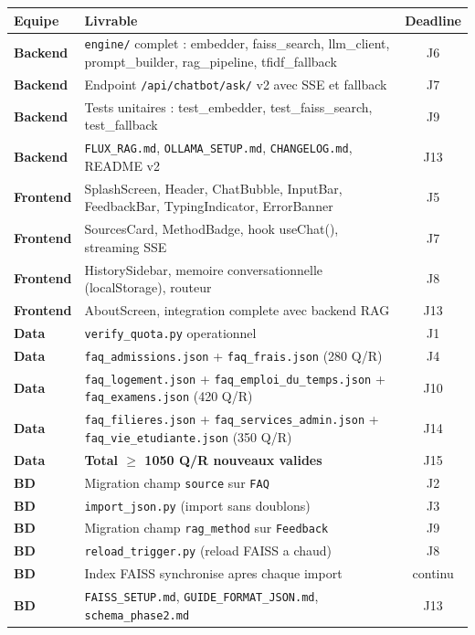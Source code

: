 \documentclass[11pt,a4paper]{article}
\begin{document}
\begin{center}
\begin{tabular}{>{\bfseries}l p{5.5cm} c}
\toprule
Equipe & Livrable & Deadline \\
\midrule
Backend  & \texttt{engine/} complet : embedder, faiss\_search, llm\_client, prompt\_builder, rag\_pipeline, tfidf\_fallback & J6 \\
Backend  & Endpoint \texttt{/api/chatbot/ask/} v2 avec SSE et fallback & J7 \\
Backend  & Tests unitaires : test\_embedder, test\_faiss\_search, test\_fallback & J9 \\
Backend  & \texttt{FLUX\_RAG.md}, \texttt{OLLAMA\_SETUP.md}, \texttt{CHANGELOG.md}, README v2 & J13 \\
\midrule
Frontend & SplashScreen, Header, ChatBubble, InputBar, FeedbackBar, TypingIndicator, ErrorBanner & J5 \\
Frontend & SourcesCard, MethodBadge, hook useChat(), streaming SSE & J7 \\
Frontend & HistorySidebar, memoire conversationnelle (localStorage), routeur & J8 \\
Frontend & AboutScreen, integration complete avec backend RAG & J13 \\
\midrule
Data     & \texttt{verify\_quota.py} operationnel & J1 \\
Data     & \texttt{faq\_admissions.json} + \texttt{faq\_frais.json} (280 Q/R) & J4 \\
Data     & \texttt{faq\_logement.json} + \texttt{faq\_emploi\_du\_temps.json} + \texttt{faq\_examens.json} (420 Q/R) & J10 \\
Data     & \texttt{faq\_filieres.json} + \texttt{faq\_services\_admin.json} + \texttt{faq\_vie\_etudiante.json} (350 Q/R) & J14 \\
Data     & \textbf{Total $\geq$ 1050 Q/R nouveaux valides} & J15 \\
\midrule
BD       & Migration champ \texttt{source} sur \texttt{FAQ} & J2 \\
BD       & \texttt{import\_json.py} (import sans doublons) & J3 \\
BD       & Migration champ \texttt{rag\_method} sur \texttt{Feedback} & J9 \\
BD       & \texttt{reload\_trigger.py} (reload FAISS a chaud) & J8 \\
BD       & Index FAISS synchronise apres chaque import & continu \\
BD       & \texttt{FAISS\_SETUP.md}, \texttt{GUIDE\_FORMAT\_JSON.md}, \texttt{schema\_phase2.md} & J13 \\
\bottomrule
\end{tabular}
\end{center}
\end{document}
